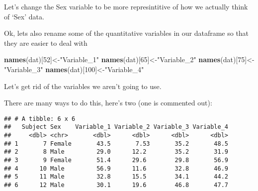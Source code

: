 \documentclass[
]{article}
\newenvironment{Shaded}{\begin{snugshade}}{\end{snugshade}}
\newcommand{\CommentTok}[1]{\textcolor[rgb]{0.56,0.35,0.01}{\textit{#1}}}
\newcommand{\DataTypeTok}[1]{\textcolor[rgb]{0.13,0.29,0.53}{#1}}
\newcommand{\DecValTok}[1]{\textcolor[rgb]{0.00,0.00,0.81}{#1}}
\newcommand{\KeywordTok}[1]{\textcolor[rgb]{0.13,0.29,0.53}{\textbf{#1}}}
\newcommand{\NormalTok}[1]{#1}
\newcommand{\OperatorTok}[1]{\textcolor[rgb]{0.81,0.36,0.00}{\textbf{#1}}}
\newcommand{\OtherTok}[1]{\textcolor[rgb]{0.56,0.35,0.01}{#1}}
\newcommand{\StringTok}[1]{\textcolor[rgb]{0.31,0.60,0.02}{#1}}
\begin{document}
Let's change the Sex variable to be more represintitive of how we
actually think of `Sex' data.

\begin{Shaded}
\end{Shaded}

Ok, lets also rename some of the quantitative variables in our dataframe
so that they are easier to deal with

\begin{Shaded}
\begin{Highlighting}[]
\KeywordTok{names}\NormalTok{(dat)[}\DecValTok{52}\NormalTok{]<-}\StringTok{"Variable_1"}
\KeywordTok{names}\NormalTok{(dat)[}\DecValTok{65}\NormalTok{]<-}\StringTok{"Variable_2"}
\KeywordTok{names}\NormalTok{(dat)[}\DecValTok{75}\NormalTok{]<-}\StringTok{"Variable_3"}
\KeywordTok{names}\NormalTok{(dat)[}\DecValTok{100}\NormalTok{]<-}\StringTok{"Variable_4"}
\end{Highlighting}
\end{Shaded}

Let's get rid of the variables we aren't going to use.

There are many ways to do this, here's two (one is commented out):

\begin{Shaded}
\end{Shaded}

\begin{verbatim}
## # A tibble: 6 x 6
##   Subject Sex    Variable_1 Variable_2 Variable_3 Variable_4
##     <dbl> <chr>       <dbl>      <dbl>      <dbl>      <dbl>
## 1       7 Female       43.5       7.53       35.2       48.5
## 2       8 Male         29.0      12.2        35.2       31.9
## 3       9 Female       51.4      29.6        29.8       56.9
## 4      10 Male         56.9      11.6        32.8       46.9
## 5      11 Male         32.8      15.5        34.1       44.2
## 6      12 Male         30.1      19.6        46.8       47.7
\end{verbatim}
\end{document}
